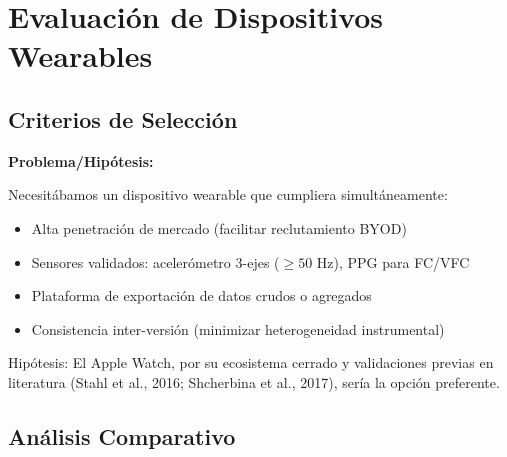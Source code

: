\documentclass[12pt,letterpaper,twoside]{report}
\begin{document}
\section{Evaluación de Dispositivos Wearables}

\subsection{Criterios de Selección}

\begin{hipotesisbox}
\textbf{Problema/Hipótesis:}

Necesitábamos un dispositivo wearable que cumpliera simultáneamente:
\begin{itemize}[noitemsep]
    \item Alta penetración de mercado (facilitar reclutamiento BYOD)
    \item Sensores validados: acelerómetro 3-ejes ($\geq 50$ Hz), PPG para FC/VFC
    \item Plataforma de exportación de datos crudos o agregados
    \item Consistencia inter-versión (minimizar heterogeneidad instrumental)
\end{itemize}

Hipótesis: El Apple Watch, por su ecosistema cerrado y validaciones previas en literatura (Stahl et al., 2016; Shcherbina et al., 2017), sería la opción preferente.
\end{hipotesisbox}

\subsection{Análisis Comparativo}
\end{document}
